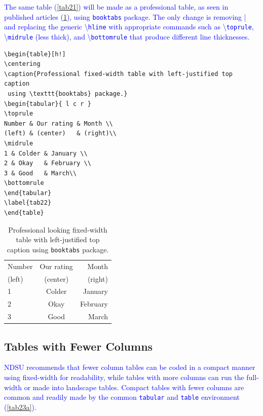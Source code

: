 \documentclass[phd]{ndsu-thesis-2022}
\newcommand\italk[1]{\textcolor{blue}{#1}}  %
\newcommand\cmd[1]{\textbackslash\texttt{#1}}  %
\begin{document}
\italk{The same table (\cref{tab21}) will be made as a professional table, as seen in published articles (\cref{tab22}), using \texttt{booktabs} package. The only change is removing | and replacing the generic \cmd{hline} with appropriate commands such as \cmd{toprule}, \cmd{midrule} (less thick), and \cmd{bottomrule} that produce different line thicknesses.
}

{\singlespacing
\begin{verbatim}
\begin{table}[h!]
\centering
\caption{Professional fixed-width table with left-justified top caption
 using \texttt{booktabs} package.}
\begin{tabular}{ l c r }
\toprule
Number & Our rating & Month \\
(left) & (center)   & (right)\\
\midrule
1 & Colder & January \\
2 & Okay   & February \\
3 & Good   & March\\
\bottomrule
\end{tabular}
\label{tab22}
\end{table}
\end{verbatim}
}
\label{tabcode22}

\begin{table}[ht!]
\centering
\caption{Professional looking fixed-width table with left-justified top caption using \texttt{booktabs} package.}
\begin{tabular}{ l c r }
\toprule
Number & Our rating & Month \\
(left) & (center)   & (right)\\
\midrule
1 & Colder & January \\
2 & Okay   & February \\
3 & Good   & March\\
\bottomrule
\end{tabular}
\label{tab22}
\end{table}

\kant[9]


\subsection{Tables with Fewer Columns}
\italk{NDSU recommends that fewer column tables can be coded in a compact manner using fixed-width for readability, while tables with more columns can run the full-width or made into landscape tables. Compact tables with fewer columns are common and readily made by the common \texttt{tabular} and \texttt{table} environment (\cref{tab23a}).} 
 
\end{document}
